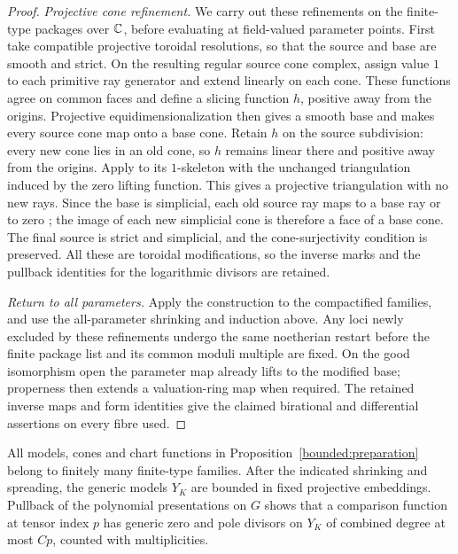 \begin{proof}
\smallskip\noindent\emph{Projective cone refinement.}
We carry out these refinements on the finite-type packages over
\(\mathbb C\), before evaluating at field-valued parameter points. First take
compatible projective toroidal resolutions, so that the source and
base are smooth and strict. On the resulting regular source cone
complex, assign value \(1\) to each primitive ray generator and extend
linearly on each cone. These functions agree on common faces and
define a slicing function \(h\), positive away from the origins.
Projective equidimensionalization
\cite[Proposition~4.4 and Lemma~4.1]{AbramovichKaruRefinement}
then gives a smooth base and makes every source cone map onto a base
cone. Retain \(h\) on the source subdivision: every new cone lies in
an old cone, so \(h\) remains linear there and positive away from the
origins. Apply
\cite[Corollary~0.11]{AbramovichRojasTriangulations}
to its \(1\)-skeleton with the unchanged triangulation induced by the
zero lifting function. This gives a projective triangulation with
no new rays. Since the base is simplicial, each old source ray maps
to a base ray or to zero
\cite[Remark~4.2]{AbramovichKaruRefinement}; the image of each new
simplicial cone is therefore a face of a base cone. The final source
is strict and simplicial, and the cone-surjectivity condition is
preserved. All these are toroidal modifications, so the inverse marks
and the pullback identities for the logarithmic divisors are retained.

\smallskip\noindent\emph{Return to all parameters.}
Apply the construction to the compactified families, and use the
all-parameter shrinking and induction above. Any loci newly excluded
by these refinements undergo the same noetherian restart before the
finite package list and its common moduli multiple are fixed. On the good
isomorphism open the parameter map already lifts to the modified
base; properness then extends a valuation-ring map when required.
The retained inverse maps and form identities give the claimed
birational and differential assertions on every fibre used.
\end{proof}

All models, cones and chart functions in Proposition~\ref{bounded:preparation}
belong to finitely many finite-type families.  After the indicated
shrinking and spreading, the generic models \(Y_K\) are bounded in
fixed projective embeddings.  Pullback of the polynomial presentations
on \(G\) shows that a comparison function at tensor index \(p\) has
generic zero and pole divisors on \(Y_K\) of combined degree at most
\(Cp\), counted with multiplicities.

